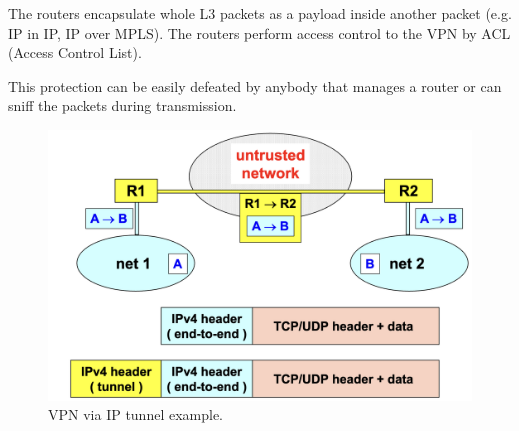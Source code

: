 \begin{multicols}{2}
\raggedcolumns

    The routers encapsulate whole L3 packets as a payload inside another packet (e.g. IP in IP, IP over MPLS). The routers perform access control to the VPN by ACL (Access Control List).

    This protection can be easily defeated by anybody that manages a router or can sniff the packets during transmission.
\columnbreak

\begin{figure}[H]
    \centering
    \includegraphics[width=\linewidth]{Images/NetSec/vpn_via_ip_tunnel.png}
    \caption{VPN via IP tunnel example.}    
\end{figure}
\end{multicols}


